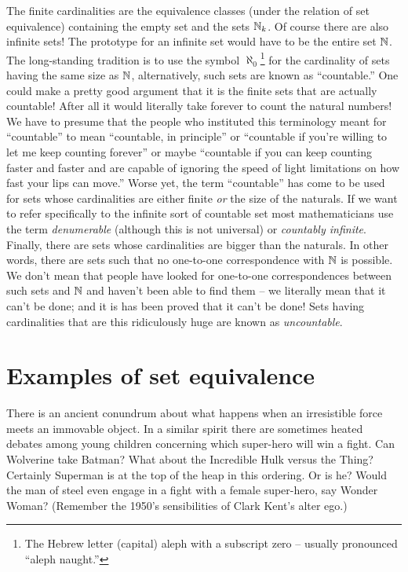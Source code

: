 The finite cardinalities are the equivalence classes (under the relation of
set equivalence) containing the empty set and the sets ${\mathbb N}_k$.  
Of course there
are also infinite sets!  The prototype for an infinite set would have to be
the entire set ${\mathbb N}$.  
The long-standing tradition is to use the 
symbol  
$\aleph_0$\footnote{The Hebrew letter (capital) aleph with a %
subscript zero -- usually pronounced ``aleph naught.''} 
for the cardinality 
of sets having the same size as ${\mathbb N}$, alternatively, such sets 
are known as ``countable.''  One could make a pretty good argument that 
it is the finite sets that are actually countable!  After all it would literally take forever to count the natural numbers!  We have to presume that the 
people who instituted
this terminology meant for ``countable'' to mean ``countable, in principle''
or ``countable if you're willing to let me keep counting forever'' or maybe
``countable if you can keep counting faster and faster and are capable of
ignoring the speed of light limitations on how fast your lips can move.''  Worse
yet, the term ``countable'' has come to be used for sets whose cardinalities are
either finite \emph{or} the size of the naturals.  If we want to refer specifically to the infinite sort of countable set most mathematicians 
use the term \emph{denumerable} (although this is not universal) or  \emph{countably infinite}.  
Finally, there are sets
whose cardinalities are bigger than the naturals.   In other words, there are
sets such that no one-to-one correspondence with ${\mathbb N}$ is possible.  
We don't mean that people have looked for one-to-one correspondences 
between such sets and ${\mathbb N}$ and haven't been able to find them -- we literally mean that it can't be done; and it is has been proved that it can't be done! Sets having cardinalities that are this ridiculously huge are known as  \emph{uncountable}. 


\clearpage




\newpage

\section{Examples of set equivalence}
\label{sec:examp_set_eq}

There is an ancient conundrum about what happens when an irresistible force
meets an immovable object.  In a similar spirit there are sometimes heated
debates among young children concerning which super-hero will win a fight.
Can Wolverine take Batman?  What about the Incredible Hulk versus the
Thing?  Certainly Superman is at the top of the heap in this ordering.  Or is
he?  Would the man of steel even engage in a fight with a female super-hero,
say Wonder Woman?  (Remember the 1950's sensibilities of Clark Kent's
alter ego.)

